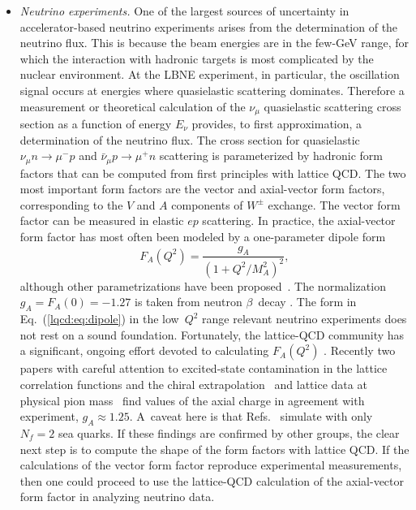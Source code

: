 \begin{itemize}
\item {\it Neutrino experiments.}  One of the largest sources of uncertainty in accelerator-based
neutrino experiments arises from the determination of the neutrino flux.
This is because the beam energies are in the few-GeV range, for which the interaction with hadronic targets
is most complicated by the nuclear environment.
At the LBNE experiment, in particular, the oscillation signal occurs at energies where quasielastic
scattering dominates.
Therefore a measurement or theoretical calculation of the $\nu_\mu$ quasielastic scattering cross section as
a function of energy $E_\nu$ provides, to first approximation, a determination of the neutrino flux.
The cross section for quasielastic $\nu_\mu n \to \mu^-p$ and $\bar{\nu}_\mu p\to \mu^+n$ scattering is 
parameterized by hadronic form factors that can be computed from first principles with lattice QCD.
The two most important form factors are the vector and axial-vector form factors, corresponding to the $V$ 
and $A$ components of $W^\pm$ exchange.
The vector form factor can be measured in elastic $ep$ scattering.
In practice, the axial-vector form factor has most often been modeled by a one-parameter dipole 
form~\cite{LlewellynSmith:1971zm}
\begin{equation}
    F_A(Q^2) = \frac{g_A}{(1+Q^2/M_A^2)^2},
    \label{lqcd:eq:dipole}
\end{equation}
although other parametrizations have been
proposed~\cite{Kelly:2004hm,Bradford:2006yz,Bodek:2007ym,Bhattacharya:2011ah}.
The normalization $g_A=F_A(0)=-1.27$ is taken from neutron $\beta$~decay \cite{Beringer:1900zz}.
The form in Eq.~(\ref{lqcd:eq:dipole}) in the low~$Q^2$ range relevant neutrino experiments does not rest on a
sound foundation.
Fortunately, the lattice-QCD community has a significant, ongoing effort devoted to calculating $F_A(Q^2)$ 
\cite{Khan:2006de,Yamazaki:2009zq,Bratt:2010jn,Alexandrou:2010hf,Alexandrou:2013joa}.
Recently two papers with careful attention to excited-state contamination in the lattice correlation functions and the chiral extrapolation~\cite{Capitani:2012gj} and 
lattice data at physical pion mass~\cite{Horsley:2013ayv} find values of the axial charge in agreement with experiment, $g_A\approx1.25$.
A~caveat here is that Refs.~\cite{Capitani:2012gj,Horsley:2013ayv} simulate with only $N_f=2$ sea quarks.
If these findings are confirmed by other groups, the clear next step is to compute the 
shape of the form factors with lattice QCD.
If the calculations of the vector form factor reproduce experimental measurements, then one could proceed to 
use the lattice-QCD calculation of the axial-vector form factor in analyzing neutrino data.


\end{itemize}
